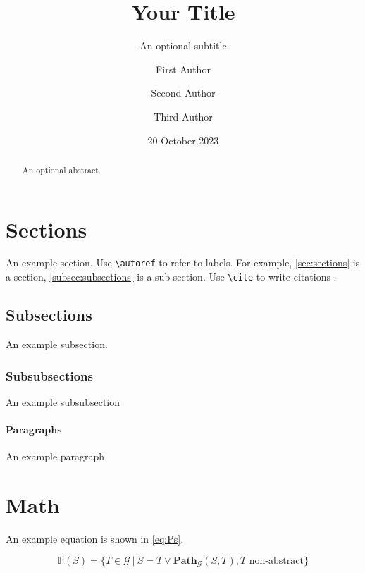 \documentclass{yqart}
\title{Your Title}                      %
\subtitle{An optional subtitle}         %
\author{First Author}                   %
\author{Second Author}                  %
\affiliation{First Institution}         %
\author{Third Author}                   %
\affiliation{Second Institution}        %
\date{20 October 2023}                  %
\begin{document}
\maketitle

\begin{abstract}                        %
    An optional abstract. \kant[1]      %
\end{abstract}                          %




\section{Sections}\label{sec:sections}

An example section. Use \verb|\autoref| to refer to labels. For example, \autoref{sec:sections} is a section, \autoref{subsec:subsections} is a sub-section. Use \verb|\cite| to write citations \cite{some:article}.

\subsection{Subsections}\label{subsec:subsections}
An example subsection.

\subsubsection{Subsubsections}
An example subsubsection

\paragraph{Paragraphs}
An example paragraph

\section{Math}
An example equation is shown in \autoref{eq:Ps}.

\begin{equation}\label{eq:Ps}
    \mathbb{P}(S)=\{T \in \mathcal{G} ~|~ S = T \lor \textbf{Path}_\mathcal{G}(S,T), T \text{ non-abstract}\}
\end{equation}
\end{document}
